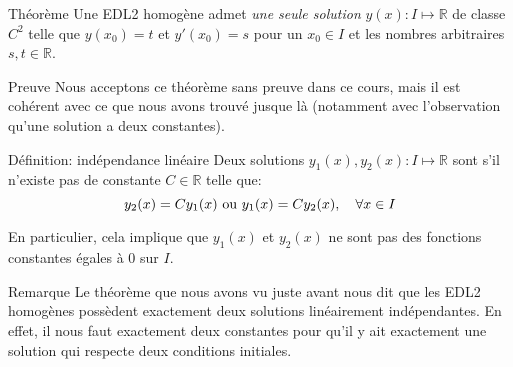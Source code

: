 \documentclass[a4paper]{article}
\begin{document}
\begin{parag}{Théorème}
    Une EDL2 homogène admet \textit{une seule solution} $y\left(x\right) : I \mapsto \mathbb{R}$ de classe $C^2$ telle que $y\left(x_0\right) = t$ et $y'\left(x_0\right) = s$ pour un $x_0 \in I$ et les nombres arbitraires $s, t \in \mathbb{R}$.

    \begin{subparag}{Preuve}
        Nous acceptons ce théorème sans preuve dans ce cours, mais il est cohérent avec ce que nous avons trouvé jusque là (notamment avec l'observation qu'une solution a deux constantes).
    \end{subparag}
\end{parag}

\begin{parag}{Définition: indépendance linéaire}
    Deux solutions $y_1\left(x\right), y_2\left(x\right) : I \mapsto \mathbb{R}$ sont  s'il n'existe pas de constante $C \in \mathbb{R}$ telle que: 
    \[y_2\left(x\right) = Cy_1\left(x\right) \text{ ou } y_1\left(x\right) = Cy_2\left(x\right), \mathspace \forall x \in I\]
    
    En particulier, cela implique que $y_1\left(x\right)$ et $y_2\left(x\right)$ ne sont pas des fonctions constantes égales à 0 sur $I$.

    \begin{subparag}{Remarque}
        Le théorème que nous avons vu juste avant nous dit que les EDL2 homogènes possèdent exactement deux solutions linéairement indépendantes. En effet, il nous faut exactement deux constantes pour qu'il y ait exactement une solution qui respecte deux conditions initiales.
    \end{subparag}
\end{parag}
\end{document}
